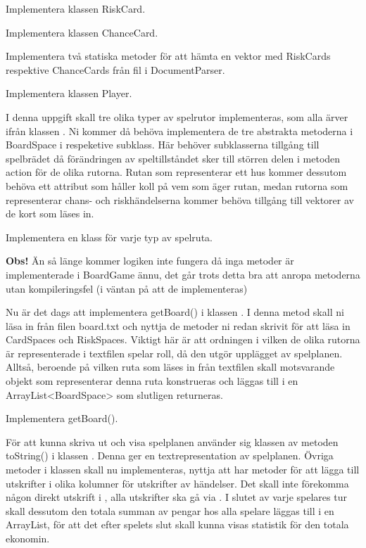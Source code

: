 \Subtask Implementera klassen RiskCard.

\Subtask Implementera klassen ChanceCard.

\Subtask Implementera två statiska metoder för att hämta en vektor med RiskCards respektive ChanceCards från fil i DocumentParser.

\Subtask Implementera klassen Player.

\Task I denna uppgift skall tre olika typer av spelrutor implementeras, som alla ärver ifrån klassen . Ni kommer då behöva implementera de tre abstrakta metoderna i BoardSpace i respeketive subklass. Här behöver subklasserna tillgång till spelbrädet då förändringen av speltillståndet sker till störren delen i metoden action för de olika rutorna. Rutan som representerar ett hus kommer dessutom behöva ett attribut som håller koll på vem som äger rutan, medan rutorna som representerar chans- och riskhändelserna kommer behöva tillgång till vektorer av de kort som läses in.


\Subtask Implementera en klass för varje typ av spelruta.

\textbf{Obs!} Än så länge kommer logiken inte fungera då inga metoder är implementerade i BoardGame ännu, det går trots detta bra att anropa metoderna utan kompileringsfel (i väntan på att de implementeras)

\Task Nu är det dags att implementera getBoard() i klassen . I denna metod skall ni läsa in från filen board.txt och nyttja de metoder ni redan skrivit för att läsa in CardSpaces och RiskSpaces. Viktigt här är att ordningen i vilken de olika rutorna är representerade i textfilen spelar roll, då den utgör upplägget av spelplanen. Alltså, beroende på vilken ruta som läses in från textfilen skall motsvarande objekt som representerar denna ruta konstrueras och läggas till i en ArrayList<BoardSpace> som slutligen returneras.

\Subtask Implementera getBoard().

\Task För att kunna skriva ut och visa spelplanen använder sig klassen   av metoden toString() i klassen . Denna ger en textrepresentation av spelplanen. Övriga metoder i klassen  skall nu implementeras, nyttja att   har metoder för att lägga till utskrifter i olika kolumner för utskrifter av händelser. Det skall inte förekomma någon direkt utskrift i  , alla utskrifter ska gå via . I slutet av varje spelares tur skall dessutom den totala summan av pengar hos alla spelare läggas till i en ArrayList, för att det efter spelets slut skall kunna visas statistik för den totala ekonomin.

